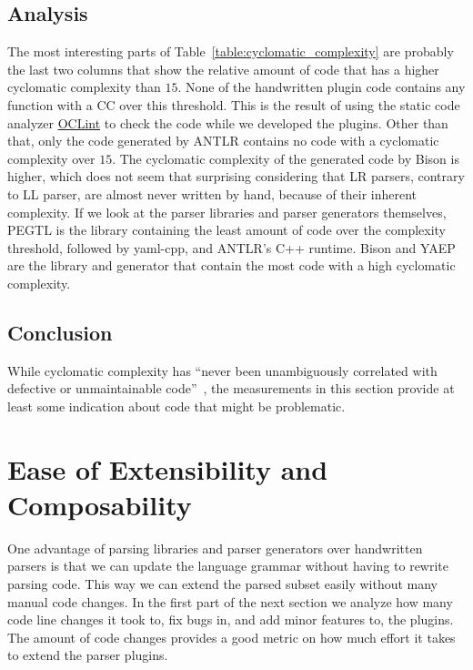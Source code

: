 \subsection{Analysis}

The most interesting parts of Table~\ref{table:cyclomatic_complexity} are probably the last two columns that show the relative amount of code that has a higher cyclomatic complexity than $15$. None of the handwritten plugin code contains any function with a \gls{CC} over this threshold. This is the result of using the static code analyzer \href{http://oclint.org}{OCLint} to check the code while we developed the plugins. Other than that, only the code generated by \gls{ANTLR} contains no code with a cyclomatic complexity over $15$. The cyclomatic complexity of the generated code by Bison is higher, which does not seem that surprising considering that LR parsers, contrary to LL parser, are almost never written by hand, because of their inherent complexity. If we look at the parser libraries and parser generators themselves, PEGTL is the library containing the least amount of code over the complexity threshold, followed by yaml-cpp, and ANTLR’s C++ runtime. Bison and YAEP are the library and generator that contain the most code with a high cyclomatic complexity.

\subsection{Conclusion}

While cyclomatic complexity has “never been unambiguously correlated with defective or unmaintainable code”~\cite{martin2017c++}, the measurements in this section provide at least some indication about code that might be problematic.

\section{Ease of Extensibility and Composability}
\label{sec:extensibility}

One advantage of parsing libraries and parser generators over handwritten parsers is that we can update the language grammar without having to rewrite parsing code. This way we can extend the parsed  subset easily without many manual code changes. In the first part of the next section we analyze how many code line changes it took to, fix bugs in, and add minor features to, the  plugins. The amount of code changes provides a good metric on how much effort it takes to extend the parser plugins.

